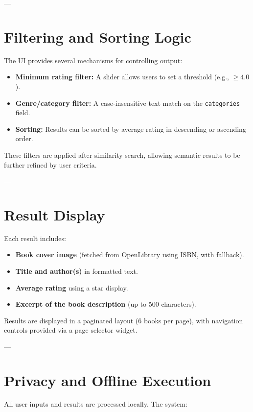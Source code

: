 ---

\section{Filtering and Sorting Logic}
\label{sec:ui-filtering}

The UI provides several mechanisms for controlling output:

\begin{itemize}
    \item \textbf{Minimum rating filter:} A slider allows users to set a threshold (e.g., $\geq 4.0$).
    \item \textbf{Genre/category filter:} A case-insensitive text match on the \texttt{categories} field.
    \item \textbf{Sorting:} Results can be sorted by average rating in descending or ascending order.
\end{itemize}

These filters are applied after similarity search, allowing semantic results to be further refined by user criteria.

---

\section{Result Display}
\label{sec:ui-display}

Each result includes:

\begin{itemize}
    \item \textbf{Book cover image} (fetched from OpenLibrary using ISBN, with fallback).
    \item \textbf{Title and author(s)} in formatted text.
    \item \textbf{Average rating} using a star display.
    \item \textbf{Excerpt of the book description} (up to 500 characters).
\end{itemize}

Results are displayed in a paginated layout (6 books per page), with navigation controls provided via a page selector widget.

---

\section{Privacy and Offline Execution}
\label{sec:ui-privacy}

All user inputs and results are processed locally. The system:

